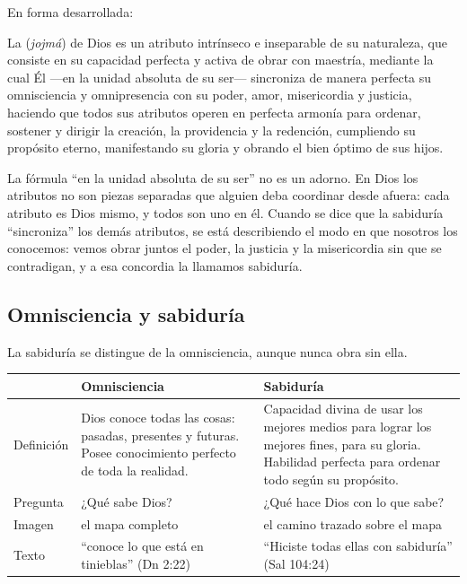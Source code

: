 En forma desarrollada:

\begin{tcolorbox}[colback=papiro,colframe=azul,boxrule=1pt,arc=3pt]
La  (\emph{jojmá}) de Dios es un atributo intrínseco e inseparable de su naturaleza, que consiste en su capacidad perfecta y activa de obrar con maestría, mediante la cual Él ---en la unidad absoluta de su ser--- sincroniza de manera perfecta su omnisciencia y omnipresencia con su poder, amor, misericordia y justicia, haciendo que todos sus atributos operen en perfecta armonía para ordenar, sostener y dirigir la creación, la providencia y la redención, cumpliendo su propósito eterno, manifestando su gloria y obrando el bien óptimo de sus hijos.
\end{tcolorbox}

La fórmula ``en la unidad absoluta de su ser'' no es un adorno. En Dios los atributos no son piezas separadas que alguien deba coordinar desde afuera: cada atributo es Dios mismo, y todos son uno en él. Cuando se dice que la sabiduría ``sincroniza'' los demás atributos, se está describiendo el modo en que nosotros los conocemos: vemos obrar juntos el poder, la justicia y la misericordia sin que se contradigan, y a esa concordia la llamamos sabiduría.


\subsection{Omnisciencia y sabiduría}

La sabiduría se distingue de la omnisciencia, aunque nunca obra sin ella.

\begin{center}\small\renewcommand{\arraystretch}{1.3}
\begin{tabular}{@{}L{2.4cm}L{6.0cm}L{6.0cm}@{}}
\toprule
 & \textbf{Omnisciencia} & \textbf{Sabiduría} \\ \midrule
Definición & Dios conoce todas las cosas: pasadas, presentes y futuras. Posee conocimiento perfecto de toda la realidad. & Capacidad divina de usar los mejores medios para lograr los mejores fines, para su gloria. Habilidad perfecta para ordenar todo según su propósito. \\
Pregunta & ¿Qué sabe Dios? & ¿Qué hace Dios con lo que sabe? \\
Imagen & el mapa completo & el camino trazado sobre el mapa \\
Texto & ``conoce lo que está en tinieblas'' (Dn 2:22) & ``Hiciste todas ellas con sabiduría'' (Sal 104:24) \\
\bottomrule
\end{tabular}\end{center}

